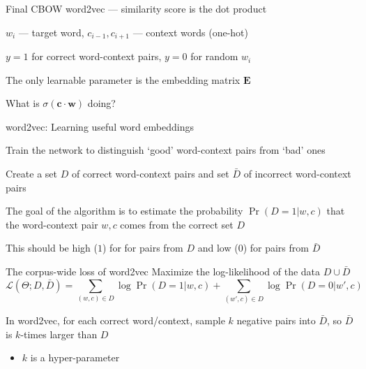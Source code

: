 \documentclass[12pt,aspectratio=169,handout]{beamer}
\begin{document}
\begin{frame}{Final CBOW word2vec --- similarity score is the dot product}
\begin{figure}
	\end{figure}	
	
	$w_i$ --- target word, $c_{i-1}, c_{i+1}$ --- context words (one-hot)
	
	$y = 1$ for correct word-context pairs, $y = 0$ for random $w_i$
	
	The only learnable parameter is the embedding matrix $\bm{E}$
	
	What is $\sigma(\bm{c} \cdot \bm{w})$ doing?
	
\end{frame}

\begin{frame}{word2vec: Learning useful word embeddings}
	
Train the network to distinguish `good' word-context pairs from `bad' ones

Create a set $D$ of correct word-context pairs and set $\bar{D}$ of incorrect word-context pairs

The goal of the algorithm is to estimate the probability $\Pr(D = 1 | w, c)$ that the word-context pair $w, c$ comes from the correct set $D$

This should be high ($1$) for for pairs from $D$ and low ($0$) for pairs from $\bar{D}$
\end{frame}

\begin{frame}{The corpus-wide loss of word2vec}
Maximize the log-likelihood of the data $D \cup \bar{D}$
$$
\mathcal{L}(\Theta; D, \bar{D}) =
\sum_{(w, c) \in D} \log \Pr (D = 1 | w, c) +
\sum_{(w', c) \in D} \log \Pr (D = 0 | w', c)
$$

\bigskip

In word2vec, for each correct word/context, sample $k$ negative pairs into $\bar{D}$, so $\bar{D}$ is $k$-times larger than $D$
\begin{itemize}
	\item $k$ is a hyper-parameter
\end{itemize}
\end{frame}
\end{document}
